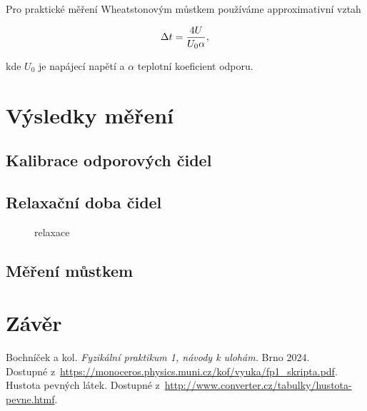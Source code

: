 \documentclass[a4paper,11pt]{article}
\begin{document}
Pro praktické měření Wheatstonovým můstkem používáme approximativní vztah

\begin{equation}
\Delta t = \frac{4U}{U_0 \alpha}, \\
\end{equation}

kde $U_0$ je napájecí napětí a $\alpha$ teplotní koeficient odporu.

\newpage

\section{Výsledky měření}

\subsection{Kalibrace odporových čidel}

\begin{figure}[ht]
  \centering
  
  \caption{}
\end{figure}

\begin{figure}[ht]
  \centering
  
\end{figure}

\subsection{Relaxační doba čidel}

\begin{figure}[htpb]
  \centering
  
  \caption{relaxace}
\end{figure}

\begin{figure}[ht]
  \centering
  
  \caption{}
\end{figure}

\subsection{Měření můstkem}

\begin{figure}[ht]
  \centering
  
\end{figure}

\section{Závěr}

\begin{thebibliography}{0}
 Bochníček a kol. \textit{Fyzikální praktikum 1, návody k ulohám.} Brno 2024.\\ Dostupné z~\url{https://monoceros.physics.muni.cz/kof/vyuka/fp1_skripta.pdf}.   
 Hustota pevných látek. Dostupné z~\url{http://www.converter.cz/tabulky/hustota-pevne.htmf}.   
\end{thebibliography}
\end{document}
